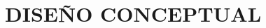 \documentclass[../General.tex]{subfiles}
\begin{document}
\onehalfspacing
{}

\chapter{DISEÑO CONCEPTUAL}






\end{document}
